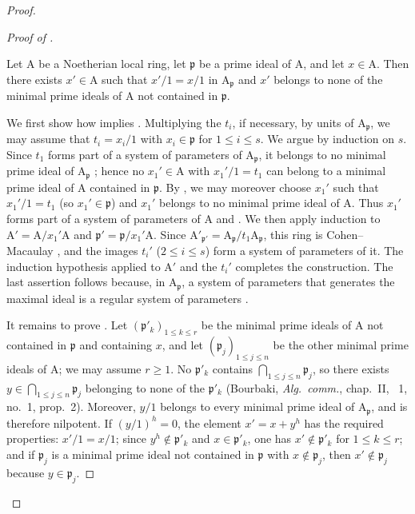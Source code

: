 \begin{proof}
\begin{proof}[Proof of ]
\begin{lemma}[18.11.3.4]
\label{IV.18.11.3.4}
Let $\mathrm{A}$ be a Noetherian local ring, let $\mathfrak{p}$ be a prime ideal of $\mathrm{A}$, and let $x\in\mathrm{A}$. Then there exists $x'\in\mathrm{A}$ such that $x'/1=x/1$ in $\mathrm{A}_{\mathfrak{p}}$ and $x'$ belongs to none of the minimal prime ideals of $\mathrm{A}$ not contained in $\mathfrak{p}$.
\end{lemma}
We first show how  implies . Multiplying the $t_i$, if necessary, by units of $\mathrm{A}_{\mathfrak{p}}$, we may assume that $t_i=x_i/1$ with $x_i\in\mathfrak{p}$ for $1\leq i\leq s$. We argue by induction on $s$. Since $t_1$ forms part of a system of parameters of $\mathrm{A}_{\mathfrak{p}}$, it belongs to no minimal prime ideal of $\mathrm{A}_{\mathfrak{p}}$ ; hence no $x_1'\in\mathrm{A}$ with $x_1'/1=t_1$ can belong to a minimal prime ideal of $\mathrm{A}$ contained in $\mathfrak{p}$. By , we may moreover choose $x_1'$ such that $x_1'/1=t_1$ (so $x_1'\in\mathfrak{p}$) and $x_1'$ belongs to no minimal prime ideal of $\mathrm{A}$. Thus $x_1'$ forms part of a system of parameters of $\mathrm{A}$  and . We then apply induction to $\mathrm{A}'=\mathrm{A}/x_1'\mathrm{A}$ and $\mathfrak{p}'=\mathfrak{p}/x_1'\mathrm{A}$. Since $\mathrm{A}'_{\mathfrak{p}'}=\mathrm{A}_{\mathfrak{p}}/t_1\mathrm{A}_{\mathfrak{p}}$, this ring is Cohen--Macaulay , and the images $t_i'$ ($2\leq i\leq s$) form a system of parameters of it. The induction hypothesis applied to $\mathrm{A}'$ and the $t_i'$ completes the construction. The last assertion follows because, in $\mathrm{A}_{\mathfrak{p}}$, a system of parameters that generates the maximal ideal is a regular system of parameters .

It remains to prove . Let $(\mathfrak{p}'_k)_{1\leq k\leq r}$ be the minimal prime ideals of $\mathrm{A}$ not contained in $\mathfrak{p}$ and containing $x$, and let $(\mathfrak{p}_j)_{1\leq j\leq n}$ be the other minimal prime ideals of $\mathrm{A}$; we may assume $r\geq1$. No $\mathfrak{p}'_k$ contains $\bigcap_{1\leq j\leq n}\mathfrak{p}_j$, so there exists
$y\in\bigcap_{1\leq j\leq n}\mathfrak{p}_j$ belonging to none of the $\mathfrak{p}'_k$ (Bourbaki, \emph{Alg.\ comm.}, chap.~II, \textsection~1, no.~1, prop.~2). Moreover, $y/1$ belongs to every minimal prime ideal of $\mathrm{A}_{\mathfrak{p}}$, and is therefore nilpotent. If $(y/1)^h=0$, the element $x'=x+y^h$ has the required properties: $x'/1=x/1$; since $y^h\notin\mathfrak{p}'_k$ and $x\in\mathfrak{p}'_k$, one has $x'\notin\mathfrak{p}'_k$ for $1\leq k\leq r$; and if $\mathfrak{p}_j$ is a minimal prime ideal not contained in $\mathfrak{p}$ with $x\notin\mathfrak{p}_j$, then $x'\notin\mathfrak{p}_j$ because $y\in\mathfrak{p}_j$.
\end{proof}


\end{proof}
